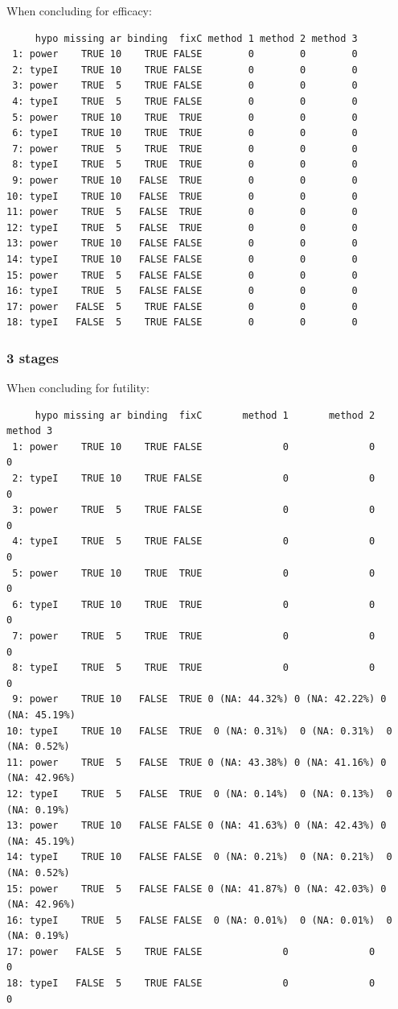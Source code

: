 \documentclass[12pt]{article}
\begin{document}
When concluding for efficacy:
\begin{verbatim}
     hypo missing ar binding  fixC method 1 method 2 method 3
 1: power    TRUE 10    TRUE FALSE        0        0        0
 2: typeI    TRUE 10    TRUE FALSE        0        0        0
 3: power    TRUE  5    TRUE FALSE        0        0        0
 4: typeI    TRUE  5    TRUE FALSE        0        0        0
 5: power    TRUE 10    TRUE  TRUE        0        0        0
 6: typeI    TRUE 10    TRUE  TRUE        0        0        0
 7: power    TRUE  5    TRUE  TRUE        0        0        0
 8: typeI    TRUE  5    TRUE  TRUE        0        0        0
 9: power    TRUE 10   FALSE  TRUE        0        0        0
10: typeI    TRUE 10   FALSE  TRUE        0        0        0
11: power    TRUE  5   FALSE  TRUE        0        0        0
12: typeI    TRUE  5   FALSE  TRUE        0        0        0
13: power    TRUE 10   FALSE FALSE        0        0        0
14: typeI    TRUE 10   FALSE FALSE        0        0        0
15: power    TRUE  5   FALSE FALSE        0        0        0
16: typeI    TRUE  5   FALSE FALSE        0        0        0
17: power   FALSE  5    TRUE FALSE        0        0        0
18: typeI   FALSE  5    TRUE FALSE        0        0        0
\end{verbatim}

\subsubsection{3 stages}
\label{sec:org4e150dd}

When concluding for futility:
\begin{verbatim}
     hypo missing ar binding  fixC       method 1       method 2       method 3
 1: power    TRUE 10    TRUE FALSE              0              0              0
 2: typeI    TRUE 10    TRUE FALSE              0              0              0
 3: power    TRUE  5    TRUE FALSE              0              0              0
 4: typeI    TRUE  5    TRUE FALSE              0              0              0
 5: power    TRUE 10    TRUE  TRUE              0              0              0
 6: typeI    TRUE 10    TRUE  TRUE              0              0              0
 7: power    TRUE  5    TRUE  TRUE              0              0              0
 8: typeI    TRUE  5    TRUE  TRUE              0              0              0
 9: power    TRUE 10   FALSE  TRUE 0 (NA: 44.32%) 0 (NA: 42.22%) 0 (NA: 45.19%)
10: typeI    TRUE 10   FALSE  TRUE  0 (NA: 0.31%)  0 (NA: 0.31%)  0 (NA: 0.52%)
11: power    TRUE  5   FALSE  TRUE 0 (NA: 43.38%) 0 (NA: 41.16%) 0 (NA: 42.96%)
12: typeI    TRUE  5   FALSE  TRUE  0 (NA: 0.14%)  0 (NA: 0.13%)  0 (NA: 0.19%)
13: power    TRUE 10   FALSE FALSE 0 (NA: 41.63%) 0 (NA: 42.43%) 0 (NA: 45.19%)
14: typeI    TRUE 10   FALSE FALSE  0 (NA: 0.21%)  0 (NA: 0.21%)  0 (NA: 0.52%)
15: power    TRUE  5   FALSE FALSE 0 (NA: 41.87%) 0 (NA: 42.03%) 0 (NA: 42.96%)
16: typeI    TRUE  5   FALSE FALSE  0 (NA: 0.01%)  0 (NA: 0.01%)  0 (NA: 0.19%)
17: power   FALSE  5    TRUE FALSE              0              0              0
18: typeI   FALSE  5    TRUE FALSE              0              0              0
\end{verbatim}
\end{document}
